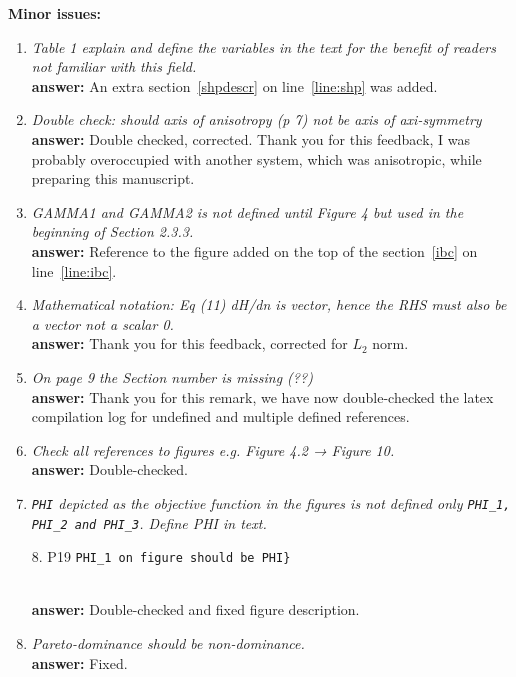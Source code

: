 \documentclass[final,3p]{elsarticle}
\begin{document}
{\bf Minor issues:}

\begin{enumerate}
\item {\it Table 1 explain and define the variables in the text for the benefit of readers not familiar with this field.} \\
{\bf answer:} An extra section~\ref{shpdescr} on line~\ref{line:shp} was added.
 
 \item {\it Double check: should axis of anisotropy (p 7) not be axis of axi-symmetry} \\
  {\bf answer:} Double checked, corrected. Thank you for this feedback, I was probably overoccupied with another system, which was anisotropic, while preparing this manuscript.
 
 \item {\it GAMMA1 and GAMMA2 is not defined until Figure 4 but used in the beginning of Section 2.3.3.}\\
 {\bf answer:} Reference to the figure added on the top of the section~\ref{ibc} on line~\ref{line:ibc}.
 
 \item {\it Mathematical notation: Eq (11) dH/dn is vector, hence the RHS must also be a vector not a scalar 0.} \\
 {\bf answer:} Thank you for this feedback, corrected for $L_2$ norm.
 
 \item {\it  On page 9 the Section number is missing (??)}\\
 {\bf answer:}  Thank you for this remark, we have now double-checked the latex compilation log for undefined and multiple defined references.
 
 \item {\it  Check all references to figures e.g. Figure 4.2 → Figure 10.} \\
 {\bf answer:} Double-checked.
 
 \item {\it \verb(PHI( depicted as the objective function in the figures is not defined only \verb(PHI_1, PHI_2 and PHI_3(. Define PHI in text.

 8. P19 \verb(PHI_1 on figure should be PHI}( }\\
 {\bf answer:} Double-checked and fixed figure description.
 
 \item {\it  Pareto-dominance should be non-dominance.} \\ 
 {\bf answer:} Fixed.
 
 
 \end{enumerate}
\end{document}
